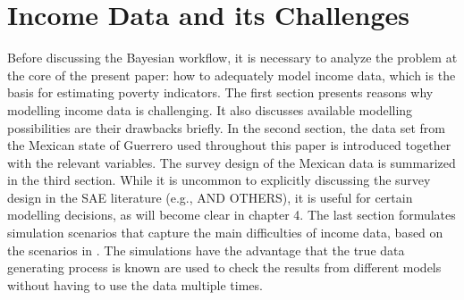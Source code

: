 \chapter{Income Data and its Challenges}

Before discussing the Bayesian workflow, it is necessary to analyze the problem at the core of the present paper: how to adequately model income data, which is the basis for estimating poverty indicators.
The first section presents reasons why modelling income data is challenging.
It also discusses available modelling possibilities are their drawbacks briefly.
In the second section, the data set from the Mexican state of Guerrero used throughout this paper is introduced together with the relevant variables.
The survey design of the Mexican data is summarized in the third section.
While it is uncommon to explicitly discussing the survey design in the SAE literature (e.g., \cite{rojas_perilla_data_2020} AND OTHERS), it is useful for certain modelling decisions, as will become clear in chapter 4.
The last section formulates simulation scenarios that capture the main difficulties of income data, based on the scenarios in \cite{rojas_perilla_data_2020}.
The simulations have the advantage that the true data generating process is known are used to check the results from different models without having to use the data multiple times.






